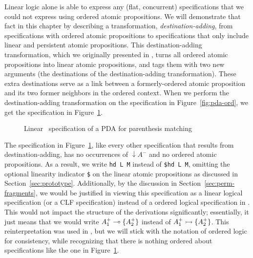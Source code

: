 Linear logic alone is able to 
express any (flat, concurrent) specifications that 
we could not express using ordered atomic propositions. 
We will demonstrate that fact in this chapter by 
describing a transformation,
{\it destination-adding}, from specifications with ordered atomic
propositions
to specifications that only include linear and persistent atomic 
propositions. This
destination-adding transformation, which we originally presented in
\cite{simmons11logical}, turns all ordered atomic propositions into
linear atomic propositions, and tags them with two new arguments (the
destinations of the destination-adding transformation). These extra
destinations serve as a link between a formerly-ordered atomic
proposition and its two former neighbors in the ordered context.  When
we perform the destination-adding transformation on the specification
in Figure~\ref{fig:pda-ord}, we get the specification in
Figure~\ref{fig:pda-lin}.

\begin{figure}[ht]
\caption{Linear \sls~specification of a PDA for parenthesis matching}
\label{fig:pda-lin}
\end{figure}

The specification in Figure~\ref{fig:pda-lin}, like every other
specification that results from destination-adding, has no occurrences
of ${\downarrow}A^-$ and no ordered atomic propositions.  As a result,
we write \verb|hd L M| instead of \verb|$hd L M|, omitting the
optional linearity indicator \verb|$| on the linear atomic
propositions as discussed in
Section~\ref{sec:prototype}. Additionally, by the discussion in
Section~\ref{sec:perm-fragments}, we would be justified in viewing
this specification as a linear logical specification (or a CLF
specification) instead of a ordered logical specification in \sls.
This would not impact the structure of the derivations significantly;
essentially, it just means that we would write $A^+_1 \multimap \{ A^+_2
\}$ instead of $A^+_1 \rightarrowtail \{ A^+_2 \}$.  This reinterpretation was
used in \cite{simmons11logical}, but we will stick with the notation
of ordered logic for consistency, while recognizing that there is
nothing ordered about specifications like the one in
Figure~\ref{fig:pda-lin}.

